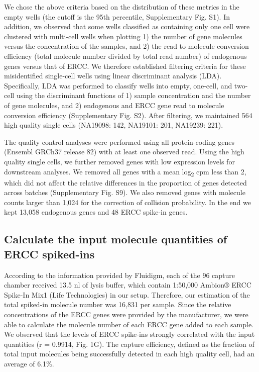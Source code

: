 We chose the above criteria based on the distribution of these metrics
in the empty wells (the cutoff is the 95th percentile, Supplementary
Fig. S1). In addition, we observed that some wells classified as
containing only one cell were clustered with multi-cell wells when
plotting 1) the number of gene molecules versus the concentration of the
samples, and 2) the read to molecule conversion efficiency (total
molecule number divided by total read number) of endogenous genes versus
that of ERCC. We therefore established filtering criteria for these
misidentified single-cell wells using linear discriminant analysis
(LDA). Specifically, LDA was performed to classify wells into empty,
one-cell, and two-cell using the discriminant functions of 1) sample
concentration and the number of gene molecules, and 2) endogenous and
ERCC gene read to molecule conversion efficiency (Supplementary Fig.
S2). After filtering, we maintained 564 high quality single cells
(NA19098: 142, NA19101: 201, NA19239: 221).

The quality control analyses were performed using all protein-coding
genes (Ensembl GRCh37 release 82) with at least one observed read. Using
the high quality single cells, we further removed genes with low
expression levels for downstream analyses. We removed all genes with a
mean log\textsubscript{2} cpm less than 2, which did not affect the
relative differences in the proportion of genes detected across batches
(Supplementary Fig. S9). We also removed genes with molecule counts
larger than 1,024 for the correction of collision probability. In the
end we kept 13,058 endogenous genes and 48 ERCC spike-in genes.

\subsection{Calculate the input molecule quantities of ERCC
spiked-ins}\label{calculate-the-input-molecule-quantities-of-ercc-spiked-ins}

According to the information provided by Fluidigm, each of the 96
capture chamber received 13.5 nl of lysis buffer, which contain 1:50,000
Ambion® ERCC Spike-In Mix1 (Life Technologies) in our setup. Therefore,
our estimation of the total spiked-in molecule number was 16,831 per
sample. Since the relative concentrations of the ERCC genes were
provided by the manufacturer, we were able to calculate the molecule
number of each ERCC gene added to each sample. We observed that the
levels of ERCC spike-ins strongly correlated with the input quantities
(r = 0.9914, Fig. 1G). The capture efficiency, defined as the fraction
of total input molecules being successfully detected in each high
quality cell, had an average of 6.1\%.

